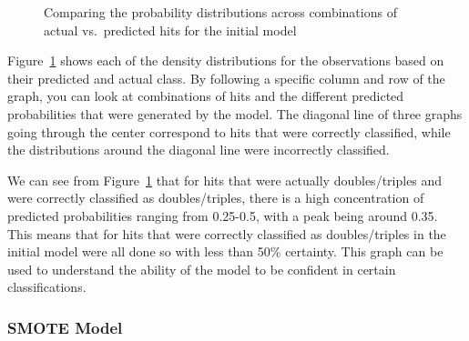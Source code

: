 \documentclass[
  letterpaper,
  DIV=11,
  numbers=noendperiod]{scrartcl}
\begin{document}
\begin{figure}[H]


\caption{\label{fig-prob-den-initial}Comparing the probability
distributions across combinations of actual vs.~predicted hits for the
initial model}

\end{figure}%

Figure~\ref{fig-prob-den-initial} shows each of the density
distributions for the observations based on their predicted and actual
class. By following a specific column and row of the graph, you can look
at combinations of hits and the different predicted probabilities that
were generated by the model. The diagonal line of three graphs going
through the center correspond to hits that were correctly classified,
while the distributions around the diagonal line were incorrectly
classified.

We can see from Figure~\ref{fig-prob-den-initial} that for hits that
were actually doubles/triples and were correctly classified as
doubles/triples, there is a high concentration of predicted
probabilities ranging from 0.25-0.5, with a peak being around 0.35. This
means that for hits that were correctly classified as doubles/triples in
the initial model were all done so with less than 50\% certainty. This
graph can be used to understand the ability of the model to be confident
in certain classifications.

\subsubsection{SMOTE Model}\label{smote-model-1}
\end{document}

